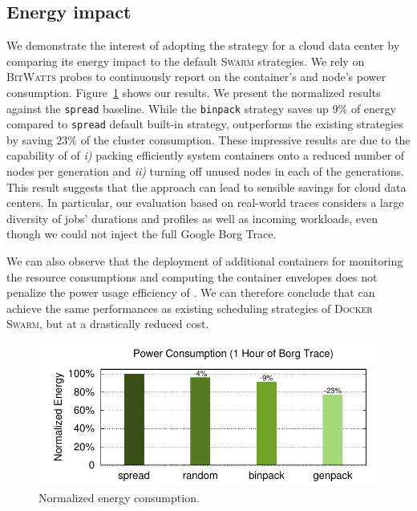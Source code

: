 \subsection{Energy impact}
\label{subsec:eval:energy}

We demonstrate the interest of adopting the \GP strategy for a cloud data center by comparing its energy impact to the default \textsc{Swarm} strategies.
We rely on \textsc{BitWatts} probes to continuously report on the container's and node's power consumption.
Figure~\ref{fig:energy:joules} shows our results.
We present the normalized results against the \texttt{spread} baseline.
While the \texttt{binpack} strategy saves up $9\%$ of energy compared to \texttt{spread} default built-in strategy, \GP outperforms the existing strategies by saving $23\%$ of the cluster consumption.
These impressive results are due to the capability of \GP of \emph{i)} packing efficiently system containers onto a reduced number of nodes per generation and \emph{ii)} turning off unused nodes in each of the generations.
This result suggests that the \GP approach can lead to sensible savings for cloud data centers.
In particular, our evaluation based on real-world traces considers a large diversity of jobs' durations and profiles as well as incoming workloads, even though we could not inject the full Google Borg Trace.

We can also observe that the deployment of additional containers for monitoring the resource consumptions and computing the container envelopes does not penalize the power usage efficiency of \GP.
We can therefore conclude that \GP{} can achieve the same performances as existing scheduling strategies of \textsc{Docker Swarm}, but at a drastically reduced cost.

\begin{figure}[t!]
  \centering
  \includegraphics[]{figures/plots/energy/energy_joule}
  \caption{Normalized energy consumption.}
  \label{fig:energy:joules}
\end{figure}

